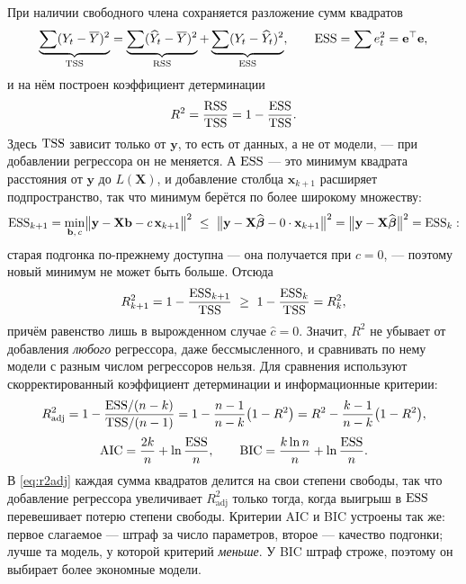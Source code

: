 При наличии свободного члена сохраняется разложение сумм квадратов
\begin{equation}
  \underbrace{\sum (Y_t - \overline{Y})^2}_{\mathrm{TSS}}
  = \underbrace{\sum (\widehat{Y}_t - \overline{Y})^2}_{\mathrm{RSS}}
  + \underbrace{\sum (Y_t - \widehat{Y}_t)^2}_{\mathrm{ESS}},
  \qquad \mathrm{ESS} = \sum e_t^2 = \mathbf{e}^{\top}\mathbf{e},
  \label{eq:ss}
\end{equation}
и на нём построен коэффициент детерминации
\begin{equation}
  R^2 = \frac{\mathrm{RSS}}{\mathrm{TSS}} = 1 - \frac{\mathrm{ESS}}{\mathrm{TSS}} .
  \label{eq:r2}
\end{equation}
Здесь $\mathrm{TSS}$ зависит только от $\mathbf{y}$, то есть от данных, а не от модели, —
при добавлении регрессора он не меняется. А $\mathrm{ESS}$ — это минимум квадрата
расстояния от $\mathbf{y}$ до $L(\mathbf{X})$, и добавление столбца
$\mathbf{x}_{k+1}$ расширяет подпространство, так что минимум берётся по более
широкому множеству:
\[
  \mathrm{ESS}_{k+1}
  = \min_{\mathbf{b},\,c} \bigl\|\mathbf{y} - \mathbf{X}\mathbf{b} - c\,\mathbf{x}_{k+1}\bigr\|^2
  \ \le\ \bigl\|\mathbf{y} - \mathbf{X}\widehat{\boldsymbol{\beta}} - 0\cdot\mathbf{x}_{k+1}\bigr\|^2
  = \bigl\|\mathbf{y} - \mathbf{X}\widehat{\boldsymbol{\beta}}\bigr\|^2
  = \mathrm{ESS}_k :
\]
старая подгонка по-прежнему доступна — она получается при $c = 0$, — поэтому
новый минимум не может быть больше. Отсюда
\[
  R^2_{k+1} = 1 - \frac{\mathrm{ESS}_{k+1}}{\mathrm{TSS}} \ \ge\ 1 - \frac{\mathrm{ESS}_k}{\mathrm{TSS}} = R^2_k ,
\]
причём равенство лишь в вырожденном случае $\widehat{c} = 0$. Значит, $R^2$ не
убывает от добавления \emph{любого} регрессора, даже бессмысленного, и сравнивать
по нему модели с разным числом регрессоров нельзя. Для сравнения используют
скорректированный коэффициент детерминации и информационные критерии:
\begin{gather}
  R^2_{\text{adj}} = 1 - \frac{\mathrm{ESS}/(n-k)}{\mathrm{TSS}/(n-1)}
                   = 1 - \frac{n-1}{n-k}\bigl(1 - R^2\bigr)
                   = R^2 - \frac{k-1}{n-k}\bigl(1 - R^2\bigr),
  \label{eq:r2adj} \\[2pt]
  \mathrm{AIC} = \frac{2k}{n} + \ln\frac{\mathrm{ESS}}{n},
  \qquad
  \mathrm{BIC} = \frac{k\ln n}{n} + \ln\frac{\mathrm{ESS}}{n} .
  \label{eq:aic}
\end{gather}
В \eqref{eq:r2adj} каждая сумма квадратов делится на свои степени свободы, так
что добавление регрессора увеличивает $R^2_{\text{adj}}$ только тогда, когда
выигрыш в $\mathrm{ESS}$ перевешивает потерю степени свободы. Критерии AIC и BIC
устроены так же: первое слагаемое — штраф за число параметров, второе —
качество подгонки; лучше та модель, у которой критерий \emph{меньше}. У BIC
штраф строже, поэтому он выбирает более экономные модели.

